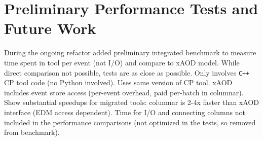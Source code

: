 \section{Preliminary Performance Tests and Future Work}\label{sec:conclusions}

During the ongoing refactor added preliminary integrated benchmark to measure time spent in tool per event (not I/O) and compare to xAOD model.
While direct comparison not possible, tests are as close as possible.
Only involves \texttt{C++} CP tool code (no Python involved).
Uses same version of CP tool.
xAOD includes event store access (per-event overhead, paid per-batch in columnar).
Show substantial speedups for migrated tools: columnar is 2-4x faster than xAOD interface (EDM access dependent).
Time for I/O and connecting columns not included in the performance comparisons (not optimized in the tests, so removed from benchmark).
